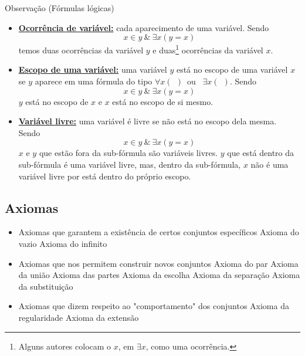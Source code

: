          \begin{mymdframed}{Observação (Fórmulas lógicas)}
            \begin{itemize}
               \item\textbf{\underline{Ocorrência de variável:}} cada aparecimento de uma variável.
                  Sendo $$x \in y\ \&\ \exists x (y = x)$$
                  temos duas ocorrências da variável $y$ e duas\footnote{Alguns autores colocam o $x$, em $\exists x$, como uma ocorrência.} ocorrências da variável $x$.
               \item \textbf{\underline{Escopo de uma variável:}} uma variável $y$ está no escopo de uma variável $x$ se $y$ aparece em uma fórmula do tipo $\forall x (\ \ )$\ ou \ $\exists x (\ \ )$.
                  Sendo $$x \in y\ \& \ \exists x (y = x)$$
                  $y$ está no escopo de $x$ e $x$ está no escopo de si mesmo.
               \item \textbf{\underline{Variável livre:}} uma variável é livre se não está no escopo dela mesma.
                  Sendo $$x \in y\ \& \ \exists x (y = x)$$
                  $x$ e $y$ que estão fora da sub-fórmula são variáveis livres. $y$ que está dentro da sub-fórmula é uma variável livre, mas, dentro da sub-fórmula, $x$ não é uma variável livre por está dentro do próprio escopo.
            \end{itemize}
         \end{mymdframed}

   \subsection{Axiomas}
      \begin{itemize}
         \item Axiomas que garantem a existência de certos conjuntos específicos
            \subitem Axioma do vazio
            \subitem Axioma do infinito    
         \item Axiomas que nos permitem construir novos conjuntos
            \subitem Axioma do par
            \subitem Axioma da união
            \subitem Axioma das partes
            \subitem Axioma da escolha
            \subitem Axioma da separação
            \subitem Axioma da substituição
         \item Axiomas que dizem respeito ao "comportamento" dos conjuntos
            \subitem Axioma da regularidade 
            \subitem Axioma da extensão
      \end{itemize}

